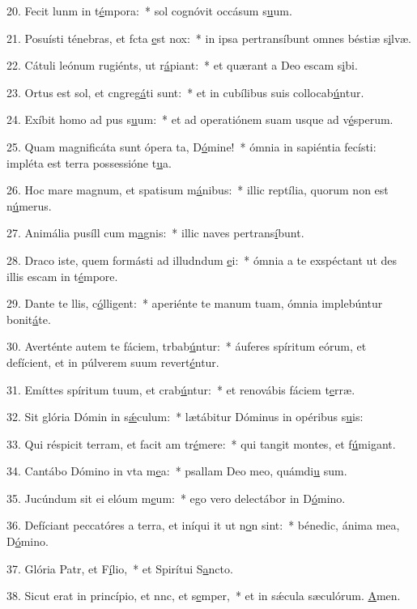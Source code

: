 20. Fecit lunm in t\uline{é}mpora:~* sol cognóvit occásum s\uline{u}um.\par 
21. Posuísti ténebras, et fcta \uline{e}st nox:~* in ipsa pertransíbunt omnes béstiæ s\uline{i}lvæ.\par 
22. Cátuli leónum rugiénts, ut r\uline{á}piant:~* et quærant a Deo escam s\uline{i}bi.\par 
23. Ortus est sol, et cngreg\uline{á}ti sunt:~* et in cubílibus suis collocab\uline{ú}ntur.\par 
24. Exíbit homo ad pus s\uline{u}um:~* et ad operatiónem suam usque ad v\uline{é}sperum.\par 
25. Quam magnificáta sunt ópera ta, D\uline{ó}mine!~* ómnia in sapiéntia fecísti: impléta est terra possessióne t\uline{u}a.\par 
26. Hoc mare magnum, et spatisum m\uline{á}nibus:~* illic reptília, quorum non est n\uline{ú}merus.\par 
27. Animália pusíll cum m\uline{a}gnis:~* illic naves pertrans\uline{í}bunt.\par 
28. Draco iste, quem formásti ad illudndum \uline{e}i:~* ómnia a te exspéctant ut des illis escam in t\uline{é}mpore.\par 
29. Dante te llis, c\uline{ó}lligent:~* aperiénte te manum tuam, ómnia implebúntur bonit\uline{á}te.\par 
30. Averténte autem te fáciem, trbab\uline{ú}ntur:~* áuferes spíritum eórum, et defícient, et in púlverem suum revert\uline{é}ntur.\par 
31. Emíttes spíritum tuum, et crab\uline{ú}ntur:~* et renovábis fáciem t\uline{e}rræ.\par 
32. Sit glória Dómin in s\uline{ǽ}culum:~* lætábitur Dóminus in opéribus s\uline{u}is:\par 
33. Qui réspicit terram, et facit am tr\uline{é}mere:~* qui tangit montes, et f\uline{ú}migant.\par 
34. Cantábo Dómino in vta m\uline{e}a:~* psallam Deo meo, quámdi\uline{u} sum.\par 
35. Jucúndum sit ei elóum m\uline{e}um:~* ego vero delectábor in D\uline{ó}mino.\par 
36. Defíciant peccatóres a terra, et iníqui it ut n\uline{o}n sint:~* bénedic, ánima mea, D\uline{ó}mino.\par 
37. Glória Patr, et F\uline{í}lio,~* et Spirítui S\uline{a}ncto.\par 
38. Sicut erat in princípio, et nnc, et s\uline{e}mper,~* et in sǽcula sæculórum. \uline{A}men.\par 
